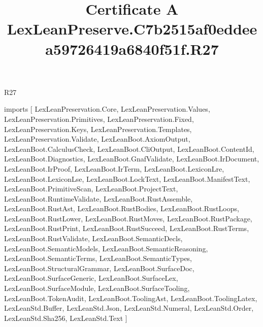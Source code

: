 \begin{lexlean}{R27}
\title{Certificate A LexLeanPreserve.C7b2515af0eddeea59726419a6840f51f.R27}
\begin{coremodule}
imports [
  LexLeanPreservation.Core,
  LexLeanPreservation.Values,
  LexLeanPreservation.Primitives,
  LexLeanPreservation.Fixed,
  LexLeanPreservation.Keys,
  LexLeanPreservation.Templates,
  LexLeanPreservation.Validate,
  LexLeanBoot.AxiomOutput,
  LexLeanBoot.CalculusCheck,
  LexLeanBoot.CliOutput,
  LexLeanBoot.ContentId,
  LexLeanBoot.Diagnostics,
  LexLeanBoot.GnafValidate,
  LexLeanBoot.IrDocument,
  LexLeanBoot.IrProof,
  LexLeanBoot.IrTerm,
  LexLeanBoot.LexiconLre,
  LexLeanBoot.LexiconLse,
  LexLeanBoot.LockText,
  LexLeanBoot.ManifestText,
  LexLeanBoot.PrimitiveScan,
  LexLeanBoot.ProjectText,
  LexLeanBoot.RuntimeValidate,
  LexLeanBoot.RustAssemble,
  LexLeanBoot.RustAst,
  LexLeanBoot.RustBodies,
  LexLeanBoot.RustLoops,
  LexLeanBoot.RustLower,
  LexLeanBoot.RustMoves,
  LexLeanBoot.RustPackage,
  LexLeanBoot.RustPrint,
  LexLeanBoot.RustSucceed,
  LexLeanBoot.RustTerms,
  LexLeanBoot.RustValidate,
  LexLeanBoot.SemanticDecls,
  LexLeanBoot.SemanticModels,
  LexLeanBoot.SemanticReasoning,
  LexLeanBoot.SemanticTerms,
  LexLeanBoot.SemanticTypes,
  LexLeanBoot.StructuralGrammar,
  LexLeanBoot.SurfaceDoc,
  LexLeanBoot.SurfaceGeneric,
  LexLeanBoot.SurfaceLex,
  LexLeanBoot.SurfaceModule,
  LexLeanBoot.SurfaceTooling,
  LexLeanBoot.TokenAudit,
  LexLeanBoot.ToolingAst,
  LexLeanBoot.ToolingLatex,
  LexLeanStd.Buffer,
  LexLeanStd.Json,
  LexLeanStd.Numeral,
  LexLeanStd.Order,
  LexLeanStd.Sha256,
  LexLeanStd.Text
]


\end{coremodule}
\end{lexlean}
